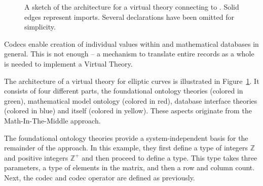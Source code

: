 \begin{figure}[h!]
\begin{center}
{
    }
    \endgroup
  \end{center}

  \caption[Virtual Theory Architecture]{
    A sketch of the architecture for a virtual theory connecting to \lmfdb. 
    Solid edges represent imports. 
    Several declarations have been omitted for simplicity. 
  }
  \label{fig:vtarch}
\end{figure}
Codecs enable creation of individual values within \lmfdb and mathematical databases in general. 
This is not enough -- a mechanism to translate entire records as a whole is needed to implement a Virtual Theory. 

The architecture of a virtual theory for \lmfdb elliptic curves is illustrated in Figure~\ref{fig:vtarch}. 
It consists of four different parts, the foundational ontology theories (colored in green), mathematical model ontology (colored in red), database interface theories (colored in blue) and \lmfdb itself (colored in yellow). 
These aspects originate from the Math-In-The-Middle approach. 

The foundational ontology theories provide a system-independent basis for the remainder of the approach. 
In this example, they first define a type of integers $\mathbb{Z}$ and positive integers $\mathbb{Z}^{+}$ and then proceed to define a  type. 
This type takes three parameters, a type of elements in the matrix, and then a row and column count. 
Next, the codec  and codec operator  are defined as previously. 

